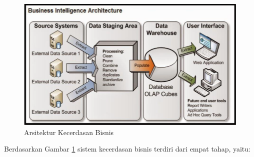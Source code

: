 \begin{figure}
	\centering
	\includegraphics[scale=0.5]{Gambar/arsitektur-kecerdasan-bisnis.png}
	\caption[Arsitektur Kecerdasan Bisnis]{Arsitektur Kecerdasan Bisnis} 
	\label{fig:arsitektur_kecerdasan_bisnis_fig}
\end{figure}

Berdasarkan Gambar \ref{fig:arsitektur_kecerdasan_bisnis_fig} sistem kecerdasan bisnis terdiri dari empat tahap, yaitu:

